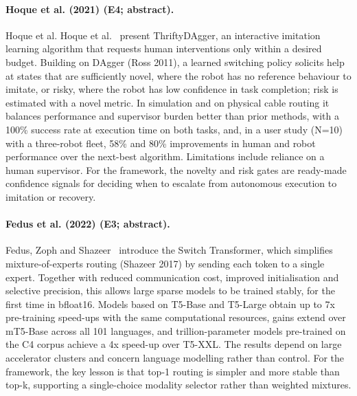 \documentclass[10pt,a4paper]{article}
\begin{document}
\paragraph{Hoque et al. (2021) (E4; abstract).} Hoque et al. Hoque et al.~\cite{Hoque2021} present ThriftyDAgger, an interactive imitation learning algorithm that requests human interventions only within a desired budget. Building on DAgger (Ross 2011), a learned switching policy solicits help at states that are sufficiently novel, where the robot has no reference behaviour to imitate, or risky, where the robot has low confidence in task completion; risk is estimated with a novel metric. In simulation and on physical cable routing it balances performance and supervisor burden better than prior methods, with a 100\% success rate at execution time on both tasks, and, in a user study (N=10) with a three-robot fleet, 58\% and 80\% improvements in human and robot performance over the next-best algorithm. Limitations include reliance on a human supervisor. For the framework, the novelty and risk gates are ready-made confidence signals for deciding when to escalate from autonomous execution to imitation or recovery.

\paragraph{Fedus et al. (2022) (E3; abstract).} Fedus, Zoph and Shazeer~\cite{Fedus2022} introduce the Switch Transformer, which simplifies mixture-of-experts routing (Shazeer 2017) by sending each token to a single expert. Together with reduced communication cost, improved initialisation and selective precision, this allows large sparse models to be trained stably, for the first time in bfloat16. Models based on T5-Base and T5-Large obtain up to 7x pre-training speed-ups with the same computational resources, gains extend over mT5-Base across all 101 languages, and trillion-parameter models pre-trained on the C4 corpus achieve a 4x speed-up over T5-XXL. The results depend on large accelerator clusters and concern language modelling rather than control. For the framework, the key lesson is that top-1 routing is simpler and more stable than top-k, supporting a single-choice modality selector rather than weighted mixtures.
\end{document}
